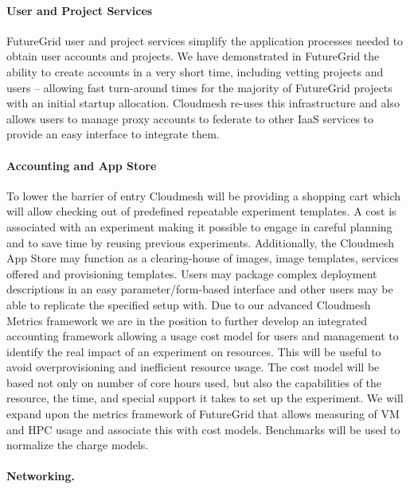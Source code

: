 \documentclass{article}
\begin{document}
\paragraph{User and Project Services}

FutureGrid user and project services simplify the application processes needed to obtain user accounts and projects. We have demonstrated in FutureGrid the ability to create accounts in a very short time, including vetting projects and users – allowing fast turn-around times for the majority of FutureGrid projects with an initial startup allocation. Cloudmesh re-uses this infrastructure and also allows users to manage proxy accounts to federate to other IaaS services to provide an easy interface to integrate them.

\paragraph{Accounting and App Store}

To lower the barrier of entry Cloudmesh will be providing a shopping cart which will allow checking out of predefined repeatable experiment templates. A cost is associated with an experiment making it possible to engage in careful planning and to save time by reusing previous experiments. Additionally, the Cloudmesh App Store may function as a clearing-house of images, image templates, services offered and provisioning templates. Users may package complex deployment descriptions in an easy parameter/form-based interface and other users may be able to replicate the specified setup with.
Due to our advanced Cloudmesh Metrics framework we are in the position to further develop an integrated accounting framework allowing a usage cost model for users and management to identify the real impact of an experiment on resources. This will be useful to avoid overprovisioning and inefficient resource usage. The cost model will be based not only on number of core hours used, but also the capabilities of the resource, the time, and special support it takes to set up the experiment. We will expand upon the metrics framework of FutureGrid that allows measuring of VM and HPC usage and associate this with cost models. Benchmarks will be used to normalize the charge models.

\paragraph{Networking.}
\end{document}
